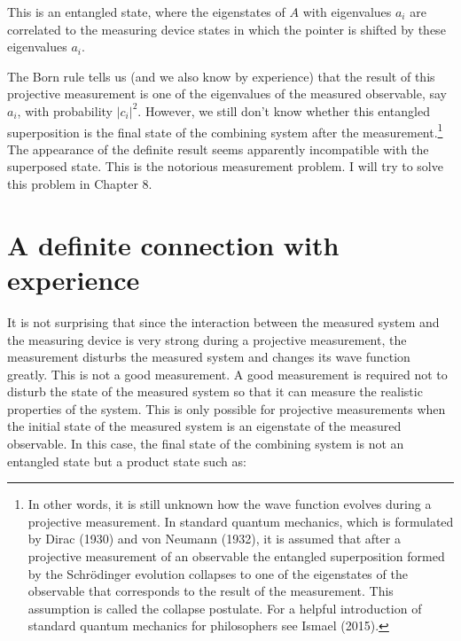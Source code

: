 \noindent  This is an entangled state, where the eigenstates of $A$ with eigenvalues $a_i$ are correlated to the measuring device states in which the pointer is shifted by these eigenvalues $a_i$.

The Born rule tells us (and we also know by experience) that the result of this projective measurement is one of the eigenvalues of the measured observable, say $a_i$, with probability $|c_i|^2$. However, we still don't know whether this entangled superposition is the final state of the combining system after the measurement.\footnote{In other words, it is still unknown how the wave function evolves during a projective measurement. In standard quantum mechanics, which is formulated by Dirac (1930) and von Neumann (1932), it is assumed that after a projective measurement of an observable the entangled superposition formed by the Schr\"{o}dinger evolution collapses to one of the eigenstates of the observable that corresponds to the result of the measurement. This assumption is called the collapse postulate. For a helpful introduction of standard quantum mechanics for philosophers see Ismael (2015).}
The appearance of the definite result seems apparently incompatible with the superposed state. This is the notorious measurement problem. I will try to solve this problem in Chapter 8.


\section{A definite connection with experience}

It is not surprising that since the interaction between the measured system and the measuring device is very strong during a projective measurement, the measurement disturbs the measured system and changes its wave function greatly. This is not a good measurement. A good measurement is required not to disturb the state of the measured system so that it can measure the realistic properties of the system. This is only possible for projective measurements when the initial state of the measured system is an eigenstate of the measured observable. In this case, the final state of the combining system is not an entangled state but a product state such as:

